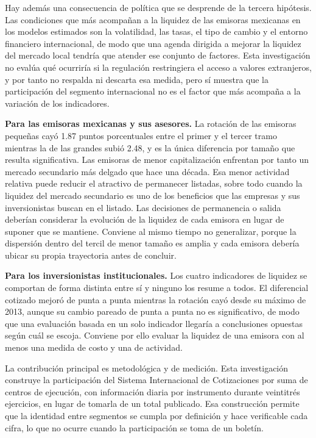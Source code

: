 Hay además una consecuencia de política que se desprende de la tercera hipótesis. Las condiciones que más acompañan a la liquidez de las emisoras mexicanas en los modelos estimados son la volatilidad, las tasas, el tipo de cambio y el entorno financiero internacional, de modo que una agenda dirigida a mejorar la liquidez del mercado local tendría que atender ese conjunto de factores. Esta investigación no evalúa qué ocurriría si la regulación restringiera el acceso a valores extranjeros, y por tanto no respalda ni descarta esa medida, pero sí muestra que la participación del segmento internacional no es el factor que más acompaña a la variación de los indicadores.

\textbf{Para las emisoras mexicanas y sus asesores.} La rotación de las emisoras pequeñas cayó 1.87 puntos porcentuales entre el primer y el tercer tramo mientras la de las grandes subió 2.48, y es la única diferencia por tamaño que resulta significativa. Las emisoras de menor capitalización enfrentan por tanto un mercado secundario más delgado que hace una década. Esa menor actividad relativa puede reducir el atractivo de permanecer listadas, sobre todo cuando la liquidez del mercado secundario es uno de los beneficios que las empresas y sus inversionistas buscan en el listado. Las decisiones de permanencia o salida deberían considerar la evolución de la liquidez de cada emisora en lugar de suponer que se mantiene. Conviene al mismo tiempo no generalizar, porque la dispersión dentro del tercil de menor tamaño es amplia y cada emisora debería ubicar su propia trayectoria antes de concluir.

\textbf{Para los inversionistas institucionales.} Los cuatro indicadores de liquidez se comportan de forma distinta entre sí y ninguno los resume a todos. El diferencial cotizado mejoró de punta a punta mientras la rotación cayó desde su máximo de 2013, aunque su cambio pareado de punta a punta no es significativo, de modo que una evaluación basada en un solo indicador llegaría a conclusiones opuestas según cuál se escoja. Conviene por ello evaluar la liquidez de una emisora con al menos una medida de costo y una de actividad.



La contribución principal es metodológica y de medición. Esta investigación construye la participación del Sistema Internacional de Cotizaciones por suma de centros de ejecución, con información diaria por instrumento durante veintitrés ejercicios, en lugar de tomarla de un total publicado. Esa construcción permite que la identidad entre segmentos se cumpla por definición y hace verificable cada cifra, lo que no ocurre cuando la participación se toma de un boletín.

